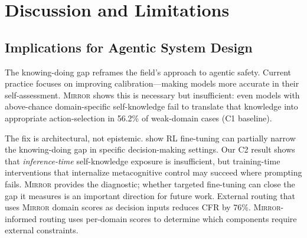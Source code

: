 \documentclass[10pt]{article}
\newcommand{\mirror}{\textsc{Mirror}}
\newcommand{\CFR}{CFR}
\begin{document}
\section{Discussion and Limitations}
\label{sec:discussion}

\subsection{Implications for Agentic System Design}

The knowing-doing gap reframes the field's approach to agentic safety. Current
practice focuses on improving calibration---making models more accurate in their
self-assessment. \mirror{} shows this is necessary but insufficient: even models
with above-chance domain-specific self-knowledge fail to translate that knowledge into
appropriate action-selection in 56.2\% of weak-domain cases (C1 baseline).

The fix is architectural, not epistemic.
\citet{schmied2026greedy} show RL fine-tuning can partially narrow the
knowing-doing gap in specific decision-making settings. Our C2 result shows that
\emph{inference-time} self-knowledge exposure is insufficient, but training-time
interventions that internalize metacognitive control may succeed where prompting
fails. \mirror{} provides the diagnostic; whether targeted fine-tuning can close
the gap it measures is an important direction for future work.
External routing that uses \mirror{}
domain scores as decision inputs reduces \CFR{} by 76\%. \mirror{}-informed routing uses per-domain scores to determine which components require external constraints.
\end{document}
